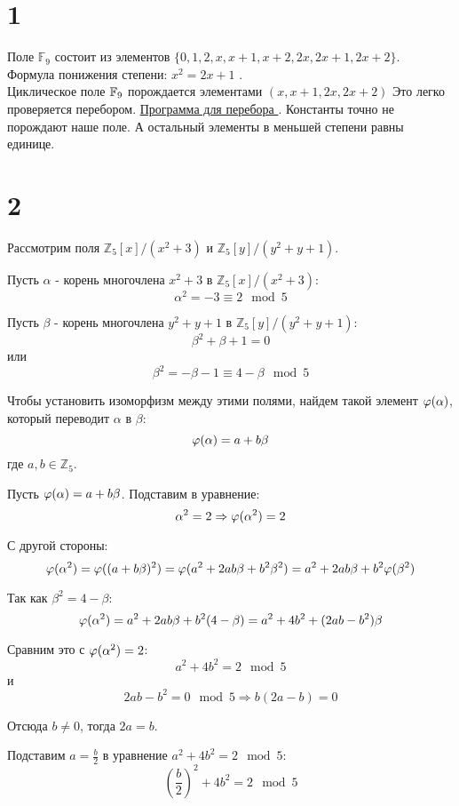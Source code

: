

\section*{1}
		Поле \(\mathbb{F}_9\) состоит из элементов \(\{0,1, 2, x,x+1, x+2, 2x, 2x+1, 2x+2\}\). \\
		 Формула понижения степени: \(x^2 = 2x+1\) .\\
		 Циклическое поле \(\mathbb{F}_9\) порождается элементами \((x, x+1,2x, 2x+2) \)
		 Это легко проверяется перебором. \href{https://pastebin.com/Nv3WfHt9}{Программа для перебора }. Константы точно не порождают наше поле. А остальный элементы в меньшей степени равны единице. 
		  
		
		\section*{2}
		Рассмотрим поля \( \mathbb{Z}_5[x]/(x^2 + 3) \) и \( \mathbb{Z}_5[y]/(y^2 + y + 1) \). 
		
		Пусть \(\alpha\) - корень многочлена \(x^2 + 3\) в \( \mathbb{Z}_5[x]/(x^2 + 3)\):
		\[
		\alpha^2 = -3 \equiv 2 \mod 5
		\]
		
		Пусть \(\beta\) - корень многочлена \(y^2 + y + 1\) в \( \mathbb{Z}_5[y]/(y^2 + y + 1)\):
		\[
		\beta^2 + \beta + 1 = 0
		\]
		или
		\[
		\beta^2 = -\beta - 1 \equiv 4 - \beta \mod 5
		\]
		
		Чтобы установить изоморфизм между этими полями, найдем такой элемент \(\varphi(\alpha)\), который переводит \(\alpha\) в \(\beta\):
		\[
		\varphi(\alpha) = a + b\beta
		\]
		где \(a, b \in \mathbb{Z}_5\).
		
		Пусть \(\varphi(\alpha) = a + b\beta\). Подставим в уравнение:
		\[
		\alpha^2 = 2 \Rightarrow \varphi(\alpha^2) = 2
		\]
		
		С другой стороны:
		\[
		\varphi(\alpha^2) = \varphi((a + b\beta)^2) = \varphi(a^2 + 2ab\beta + b^2\beta^2) = a^2 + 2ab\beta + b^2\varphi(\beta^2)
		\]
		
		Так как \(\beta^2 = 4 - \beta\):
		\[
		\varphi(\alpha^2) = a^2 + 2ab\beta + b^2(4 - \beta) = a^2 + 4b^2 + (2ab - b^2)\beta
		\]
		
		Сравним это с \(\varphi(\alpha^2) = 2\):
		\[
		a^2 + 4b^2 = 2 \mod 5
		\]
		и
		\[
		2ab - b^2 = 0 \mod 5 \Rightarrow b(2a - b) = 0
		\]
		
		Отсюда \(b \neq 0\), тогда \(2a = b\).
		
		Подставим \(a = \frac{b}{2}\) в уравнение \(a^2 + 4b^2 = 2 \mod 5\):
		\[
		\left(\frac{b}{2}\right)^2 + 4b^2 = 2 \mod 5
		\]
		
